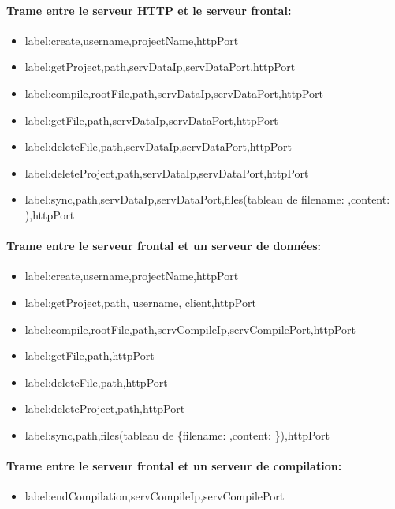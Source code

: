 \documentclass[a4paper,12pt]{article}
\begin{document}
\paragraph{Trame entre le serveur HTTP et le serveur frontal:}
\begin{itemize}
 \item label:create,username,projectName,httpPort
 \item label:getProject,path,servDataIp,servDataPort,httpPort
 \item label:compile,rootFile,path,servDataIp,servDataPort,httpPort
 \item label:getFile,path,servDataIp,servDataPort,httpPort
 \item label:deleteFile,path,servDataIp,servDataPort,httpPort
 \item label:deleteProject,path,servDataIp,servDataPort,httpPort
 \item label:sync,path,servDataIp,servDataPort,files(tableau de
{filename: ,content: }),httpPort
\end{itemize}

\paragraph{Trame entre le serveur frontal et un serveur de données:}
\begin{itemize}
 \item label:create,username,projectName,httpPort
 \item label:getProject,path, username, client,httpPort
 \item label:compile,rootFile,path,servCompileIp,servCompilePort,httpPort
 \item label:getFile,path,httpPort
 \item label:deleteFile,path,httpPort
 \item label:deleteProject,path,httpPort
 \item label:sync,path,files(tableau de \{filename: ,content: \}),httpPort
\end{itemize}

\paragraph{Trame entre le serveur frontal et un serveur de compilation:}
\begin{itemize}
 \item label:endCompilation,servCompileIp,servCompilePort
\end{itemize}
\end{document}
